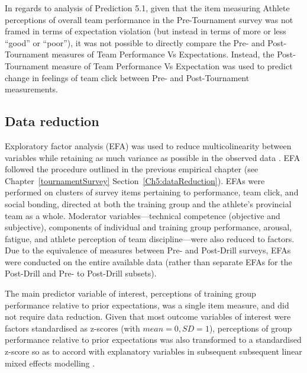 In regards to analysis of Prediction 5.1, given that the item measuring Athlete perceptions of overall team performance in the Pre-Tournament survey was not framed in terms of expectation violation (but instead in terms of more or less ``good'' or ``poor''), it was not possible to directly compare the Pre- and Post-Tournament measures of Team Performance Vs Expectations.  Instead, the Post-Tournament measure of Team Performance Vs Expectation was used to predict change in feelings of team click between Pre- and Post-Tournament measurements.




\subsection{Data reduction}
Exploratory factor analysis (EFA) was used to reduce multicolinearity between variables while retaining as much variance as possible in the observed data \citep[, see Appendix~\ref{app5:EFA}]{Yong2013}. EFA followed the procedure outlined in the previous empirical chapter (see Chapter~\ref{tournamentSurvey} Section~\ref{Ch5:dataReduction}).
EFAs were performed on clusters of survey items pertaining to performance, team click, and social bonding, directed at both the training group and the athlete's provincial team as a whole.  Moderator variables---technical competence (objective and subjective), components of individual and training group performance, arousal, fatigue, and athlete perception of team discipline---were also reduced to factors. Due to the equivalence of measures between Pre- and Post-Drill surveys, EFAs were conducted on the entire available data (rather than separate EFAs for the Post-Drill and Pre- to Post-Drill subsets).




The main predictor variable of interest, perceptions of training group performance relative to prior expectations, was a single item measure, and did not require data reduction.  Given that most outcome variables of interest were factors standardised as z-scores (with $mean = 0, SD = 1$), perceptions of group performance relative to prior expectations was also transformed to a standardised z-score so as to accord with explanatory variables in subsequent subsequent linear mixed effects modelling \citep[for an explanation, see, for example, ][1058]{Beckmann2003}.


